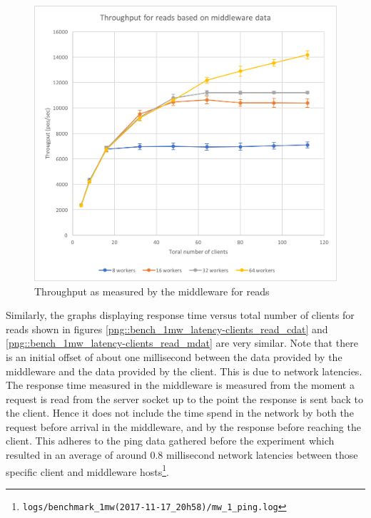 \documentclass[11pt,a4paper]{article}
\begin{document}
\begin{figure}[!h]
\begin{minipage}[b]{.45\textwidth}
        \includegraphics[width=\textwidth]{processing/graphics/bench_1mw_through-clients_read_mdat.png}
        \caption{Throughput as measured by the middleware for reads}
        \label{png::bench_1mw_through-clients_read_mdat}
    \end{minipage}
\end{figure}

Similarly, the graphs displaying response time versus total number of clients for reads shown in figures \ref{png::bench_1mw_latency-clients_read_cdat} and \ref{png::bench_1mw_latency-clients_read_mdat} are very similar. Note that there is an initial offset of about one millisecond between the data provided by the middleware and the data provided by the client. This is due to network latencies. The response time measured in the middleware is measured from the moment a request is read from the server socket up to the point the response is sent back to the client. Hence it does not include the time spend in the network by both the request before arrival in the middleware, and by the response before reaching the client. This adheres to the ping data gathered before the experiment which resulted in an average of around 0.8 millisecond network latencies between those specific client and middleware hosts\footnote{\texttt{logs/benchmark_1mw(2017-11-17_20h58)/mw_1_ping.log}}.
\end{document}
